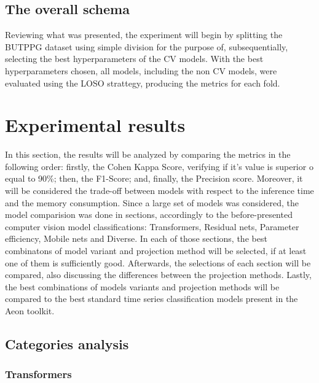 \subsection{The overall schema}

Reviewing what was presented, the experiment will begin by splitting the \acrshort{BUTPPG} dataset using simple division for the purpose of, subsequentially, selecting the best hyperparameters of the \acrshort{CV} models. With the best hyperparameters chosen, all models, including the non \acrshort{CV} models, were evaluated using the \acrshort{LOSO} strattegy, producing the metrics for each fold.


\section{Experimental results}


In this section, the results will be analyzed by comparing the metrics in the following order: firstly, the Cohen Kappa Score, verifying if it's value is superior o equal to 90\%; then, the F1-Score; and, finally, the Precision score. Moreover, it will be considered the trade-off between models with respect to the inference time and the memory consumption. Since a large set of models was considered, the model comparision was done in sections, accordingly to the before-presented computer vision model classifications: Transformers, Residual nets, Parameter efficiency, Mobile nets and Diverse. In each of those sections, the best combinatons of model variant and projection method will be selected, if at least one of them is sufficiently good. Afterwards, the selections of each section will be compared, also discussing the differences between the projection methods. Lastly, the best combinations of models variants and projection methods will be compared to the best standard time series classification models present in the Aeon toolkit.


\pagebreak

\subsection{Categories analysis}

\subsubsection{Transformers}



